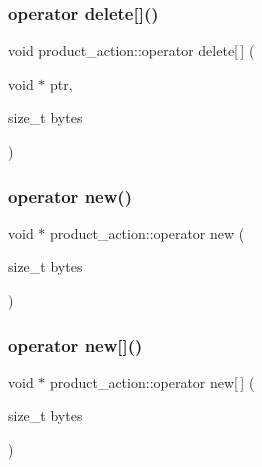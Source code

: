 \mbox{\label{classproduct__action_af67890630daacde603c8a369c41434b0}} 
\subsubsection{\texorpdfstring{operator delete[]()}{operator delete[]()}}
{\footnotesize\ttfamily void product\+\_\+action\+::operator delete\mbox{[}$\,$\mbox{]} (\begin{DoxyParamCaption}\item[{void $\ast$}]{ptr,  }\item[{size\+\_\+t}]{bytes }\end{DoxyParamCaption})}

\mbox{\label{classproduct__action_a6159036a9eb9bcbbbe29cf476f1ed66f}} 
\subsubsection{\texorpdfstring{operator new()}{operator new()}}
{\footnotesize\ttfamily void $\ast$ product\+\_\+action\+::operator new (\begin{DoxyParamCaption}\item[{size\+\_\+t}]{bytes }\end{DoxyParamCaption})}

\mbox{\label{classproduct__action_a94963beab8d937869d5b8f1bcbdbe2b8}} 
\subsubsection{\texorpdfstring{operator new[]()}{operator new[]()}}
{\footnotesize\ttfamily void $\ast$ product\+\_\+action\+::operator new\mbox{[}$\,$\mbox{]} (\begin{DoxyParamCaption}\item[{size\+\_\+t}]{bytes }\end{DoxyParamCaption})}



